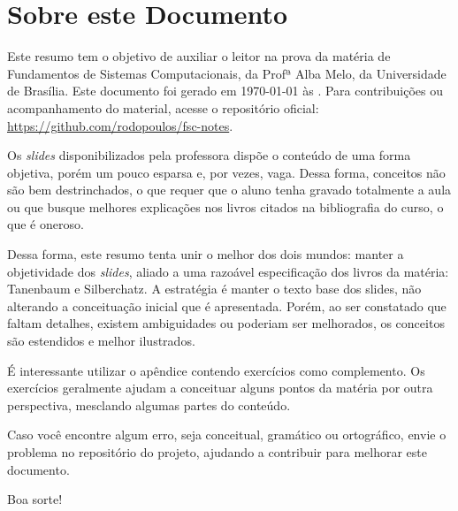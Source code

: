 \chapter*{Sobre este Documento}

Este resumo tem o objetivo de auxiliar o leitor na prova da matéria de Fundamentos de Sistemas Computacionais, da Profª Alba Melo, da Universidade de Brasília. Este documento foi gerado em \today{} às \currenttime. Para contribuições ou acompanhamento do material, acesse o repositório oficial: \url{https://github.com/rodopoulos/fsc-notes}.

Os \textit{slides} disponibilizados pela professora dispõe o conteúdo de uma forma objetiva, porém um pouco esparsa e, por vezes, vaga. Dessa forma, conceitos não são bem destrinchados, o que requer que o aluno tenha gravado totalmente a aula ou que busque melhores explicações nos livros citados na bibliografia do curso, o que é oneroso.

Dessa forma, este resumo tenta unir o melhor dos dois mundos: manter a objetividade dos \textit{slides}, aliado a uma razoável especificação dos livros da matéria: Tanenbaum e Silberchatz. A estratégia é manter o texto base dos slides, não alterando a conceituação inicial que é apresentada. Porém, ao ser constatado que faltam detalhes, existem ambiguidades ou poderiam ser melhorados, os conceitos são estendidos e melhor ilustrados.

É interessante utilizar o apêndice contendo exercícios como complemento. Os exercícios geralmente ajudam a conceituar alguns pontos da matéria por outra perspectiva, mesclando algumas partes do conteúdo.

Caso você encontre algum erro, seja conceitual, gramático ou ortográfico, envie o problema no repositório do projeto, ajudando a contribuir para melhorar este documento.

Boa sorte!
